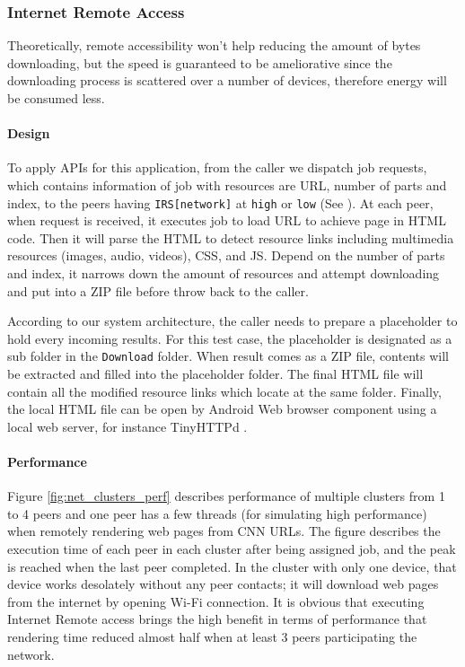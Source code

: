 \documentclass[conference]{IEEEtran}
\begin{document}
\subsubsection{Internet Remote Access} 
Theoretically, remote accessibility won't help reducing the amount of bytes downloading, but the speed is guaranteed to be ameliorative since the downloading process is scattered over a number of devices, therefore energy will be consumed less. 

\paragraph{Design}

To apply APIs for this application, from the caller we dispatch job requests, which contains information of job with resources are URL, number of parts and index, to the peers having \texttt{IRS[network]} at \texttt{high} or \texttt{low} (See ). At each peer, when request is received, it executes job to load URL to achieve page in HTML code. Then it will parse the HTML to detect resource links including multimedia resources (images, audio, videos), CSS, and JS. Depend on the number of parts and index, it narrows down the amount of resources and attempt downloading and put into a ZIP file before throw back to the caller.

According to our system architecture, the caller needs to prepare a placeholder to hold every incoming results. For this test case, the placeholder is designated as a sub folder in the \texttt{Download} folder. When result comes as a ZIP file, contents will be extracted and filled into the placeholder folder. The final HTML file will contain all the modified resource links which locate at the same folder. Finally, the local HTML file can be open by Android Web browser component using a local web server, for instance TinyHTTPd \cite{tinyhttpd}.

\paragraph{Performance}
Figure \ref{fig:net_clusters_perf} describes performance of multiple clusters from 1 to 4 peers and one peer has a few threads (for simulating high performance) when remotely rendering web pages from CNN URLs. The figure describes the execution time of each peer in each cluster after being assigned job, and the peak is reached when the last peer completed. In the cluster with only one device, that device works desolately without any peer contacts; it will download web pages from the internet by opening Wi-Fi connection. It is obvious that executing Internet Remote access brings the high benefit in terms of performance that rendering time reduced almost half when at least 3 peers participating the network. 
\end{document}
